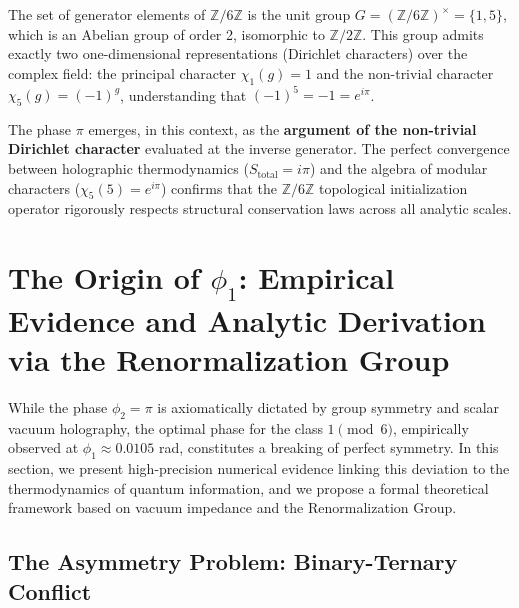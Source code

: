 \documentclass[reprint,aps,pra,superscriptaddress,nofootinbib]{revtex4-2}
\theoremstyle{plain}
\theoremstyle{definition}
\theoremstyle{remark}
\begin{document}
The set of generator elements of $\mathbb{Z}/6\mathbb{Z}$ is the unit group $G = (\mathbb{Z}/6\mathbb{Z})^{\times} = \{1,5\}$, which is an Abelian group of order 2, isomorphic to $\mathbb{Z}/2\mathbb{Z}$. This group admits exactly two one-dimensional representations (Dirichlet characters) over the complex field: the principal character $\chi_1(g) = 1$ and the non-trivial character $\chi_5(g) = (-1)^g$, understanding that $(-1)^5 = -1 = e^{i\pi}$.

The phase $\pi$ emerges, in this context, as the \textbf{argument of the non-trivial Dirichlet character} evaluated at the inverse generator. The perfect convergence between holographic thermodynamics ($S_{\text{total}} = i\pi$) and the algebra of modular characters ($\chi_5(5) = e^{i\pi}$) confirms that the $\mathbb{Z}/6\mathbb{Z}$ topological initialization operator rigorously respects structural conservation laws across all analytic scales.

\section{The Origin of $\phi_1$: Empirical Evidence and Analytic Derivation via the Renormalization Group}
\label{sec:origen_phi1}

While the phase $\phi_2 = \pi$ is axiomatically dictated by group symmetry and scalar vacuum holography, the optimal phase for the class $1 \pmod 6$, empirically observed at $\phi_1 \approx 0.0105$ rad, constitutes a breaking of perfect symmetry. In this section, we present high-precision numerical evidence linking this deviation to the thermodynamics of quantum information, and we propose a formal theoretical framework based on vacuum impedance and the Renormalization Group.

\subsection{The Asymmetry Problem: Binary-Ternary Conflict}
\end{document}
